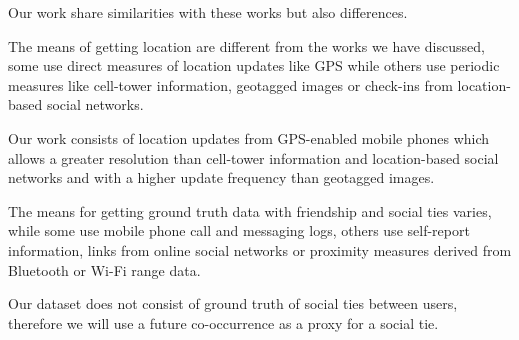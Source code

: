 Our work share similarities with these works but also differences.

The means of getting location are different from the works we have discussed, some use direct measures of location updates like GPS\cite{cranshaw2010bridging} while others use periodic measures like cell-tower information\cite{eagle}, geotagged images\cite{crandall2010inferring} or check-ins from location-based social networks\cite{FaMUMiLBSN}.

Our work consists of location updates from GPS-enabled mobile phones which allows a greater resolution than cell-tower information and location-based social networks and with a higher update frequency than geotagged images.

The means for getting ground truth data with friendship and social ties varies, while some use mobile phone call and messaging logs, others use self-report information\cite{eagle}, links from online social networks\cite{cranshaw2010bridging}\cite{crandall2010inferring} or proximity measures derived from Bluetooth\cite{eagle} or Wi-Fi range data\cite{IPISTWS}.

Our dataset does not consist of ground truth of social ties between users, therefore we will use a future co-occurrence as a proxy for a social tie.